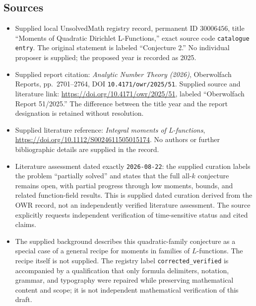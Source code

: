 \documentclass[11pt]{article}
\begin{document}
\subsection{Sources}
\begin{itemize}
\item Supplied local UnsolvedMath registry record, permanent ID \(30006456\), title ``Moments of Quadratic Dirichlet L-Functions,'' exact source code \texttt{catalogue entry}. The original statement is labeled ``Conjecture 2.'' No individual proposer is supplied; the proposed year is recorded as 2025.
\item Supplied report citation: \emph{Analytic Number Theory (2026)}, Oberwolfach Reports, pp.\ 2701--2764, DOI \texttt{10.4171/owr/2025/51}. Supplied source and literature link: \url{https://doi.org/10.4171/owr/2025/51}, labeled ``Oberwolfach Report 51/2025.'' The difference between the title year and the report designation is retained without resolution.
\item Supplied literature reference: \emph{Integral moments of L-functions}, \url{https://doi.org/10.1112/S0024611505015174}. No authors or further bibliographic details are supplied in the record.
\item Literature assessment dated exactly \texttt{2026-08-22}: the supplied curation labels the problem ``partially solved'' and states that the full all-\(k\) conjecture remains open, with partial progress through low moments, bounds, and related function-field results. This is supplied dated curation derived from the OWR record, not an independently verified literature assessment. The source explicitly requests independent verification of time-sensitive status and cited claims.
\item The supplied background describes this quadratic-family conjecture as a special case of a general recipe for moments in families of \(L\)-functions. The recipe itself is not supplied. The registry label \texttt{corrected\_verified} is accompanied by a qualification that only formula delimiters, notation, grammar, and typography were repaired while preserving mathematical content and scope; it is not independent mathematical verification of this draft.
\end{itemize}
\end{document}
